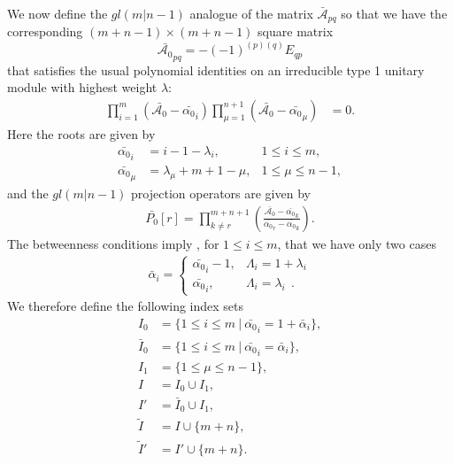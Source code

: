\documentclass[12pt]{article}
\def\nn{\nonumber}
\begin{document}

We now define the $gl(m|n-1)$ analogue of the matrix $\bar{\mathcal{A}}_{pq}$ so that we have the corresponding $(m+n-1) \times (m+n-1)$ square matrix
$$
\bar{\mathcal{A}_0}_{pq} = -(-1)^{(p)(q)} E_{qp}
$$
that satisfies the usual polynomial identities on an irreducible type 1 unitary module with highest weight $\lambda$:
\begin{align*}
\prod_{i=1}^m (\bar{\mathcal{A}_0} - \bar{\alpha_0}_i) \prod^{n+1}_{\mu = 1} (\bar{\mathcal{A}_0} - \bar{\alpha_0}_\mu) &= 0.
\end{align*}
Here the roots are given by
\begin{align*}
\bar{\alpha_0}_i  &= i - 1 -{\lambda}_i , &1\leq i\leq m, \\
\bar{\alpha_0}_\mu &= {\lambda}_\mu + m + 1 - \mu,  &1\leq \mu \leq n - 1,
\end{align*}
and the $gl(m|n-1)$ projection operators are given by
\begin{align}
\bar{P_0}[r] = \prod_{k\neq r}^{m+n+1}\left( \frac{\bar{\mathcal{A}_0}  -\bar{\alpha_0}_k}{\bar{\alpha_0}_r - \bar{\alpha_0}_k} \right).
\end{align}
The betweenness conditions imply 
\cite{GIW1}, for $1\leq i\leq m$, that we have only two cases
\begin{align}
\bar{\alpha}_i = \left\{ \begin{array}{rl}  \bar{\alpha_0}_i - 1,& \Lambda_i = 1+\lambda_i\\
                                    \bar{\alpha_0}_i,& \Lambda_i = \lambda_i  ~~.
\end{array} \right.
\nn
\end{align}
We therefore define the following index sets
\begin{align}
I_0 &=  \{ 1\leq i\leq m\ |\ \bar{\alpha_0}_i=1+\bar{\alpha}_i \},\nn\\
\bar{I}_0 &=  \{ 1\leq i\leq m\ |\ \bar{\alpha_0}_i=\bar{\alpha}_i  \},\nn\\
I_1 &= \{ 1\leq\mu\leq n-1\},\nn\\
I &= I_0\cup I_1,\nn\\
I'&= \bar{I}_0\cup I_1,\nn\\
\tilde{I} &= I\cup \{m+n\},\nn\\
\tilde{I}' &= I'\cup \{m+n\}.
\label{DefIndexSets1} 
\end{align}
\end{document}
